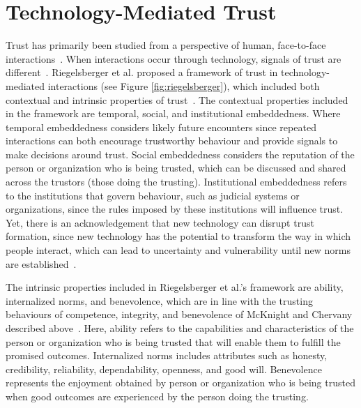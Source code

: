 \documentclass{article}
\newcommand{\brendan}[1]{\textcolor{blue}{}}
\begin{document}
\section{Technology-Mediated Trust} 
Trust has primarily been studied from a perspective of human, face-to-face interactions~\cite{mcknight1996meanings}. When interactions occur through technology, signals of trust are different~\cite{shneiderman2000designing}.  
Riegelsberger et al. proposed a framework of trust in technology-mediated interactions (see Figure \ref{fig:riegelsberger}), which included both contextual and intrinsic properties of trust~\cite{riegelsberger2005mechanics}. The contextual properties included in the framework are temporal, social, and institutional embeddedness. Where temporal embeddedness considers likely future encounters since repeated interactions can both encourage trustworthy behaviour and provide signals to make decisions around trust. Social embeddedness considers the reputation of the person or organization who is being trusted, which can be discussed and shared across the trustors (those doing the trusting). Institutional embeddedness refers to the institutions that govern behaviour, such as judicial systems or organizations, since the rules imposed by these institutions will influence trust. Yet, there is an acknowledgement that new technology can disrupt trust formation, since new technology has the potential to transform the way in which people interact, which can lead to uncertainty and vulnerability until new norms are established~\cite{mcknight2000trust}. 

\brendan{There is also cultural embeddedness see summary doc https://www.redefinerswl.org/post/what-is-cultural-embeddedness-and-how-to-find-freedom-from-it that includes aspects of 'shared meaning'. Of course multiple langauges enables us to have multiple shared meanings, truths and trust frameworks. I wonder if one of our tasks is to explore a 'shared meaning' of veracity through multiple cultural lenses/ languages etc. Build a common form of trust.
Our diversity and willingness to work together is a perfect environment to experiment with this. A kind of living lab, not just a Veracity one.}

The intrinsic properties included in Riegelsberger et al.'s framework are ability, internalized norms, and benevolence, which are in line with the trusting behaviours of competence, integrity, and benevolence of McKnight and Chervany described above~\cite{mcknight2001trust}. Here, ability refers to the capabilities and characteristics of the person or organization who is being trusted that will enable them to fulfill the promised outcomes. Internalized norms includes attributes such as honesty, credibility, reliability, dependability, openness, and good will. Benevolence represents the enjoyment obtained by person or organization who is being trusted when good outcomes are experienced by the person doing the trusting.
\end{document}

